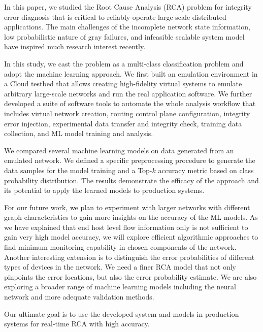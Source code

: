 In this paper, we studied the Root Cause Analysis (RCA) problem for integrity error diagnosis that is critical to reliably operate large-scale distributed applications. The main challenges of the incomplete network state information, low probabilistic nature of gray failures, and infeasible scalable system model have inspired much research interest recently.

In this study, we cast the problem as a multi-class classification problem and adopt the machine learning approach. We first built an emulation environment in a Cloud testbed that allows creating high-fidelity virtual systems to emulate arbitrary large-scale networks and run the real application software. We further developed a suite of software tools to automate the whole analysis workflow that includes virtual network creation, routing control plane configuration, integrity error injection, experimental data transfer and integrity check, training data collection, and ML model training and analysis.

We compared several machine learning models on data generated from an emulated network. We defined a specific preprocessing procedure to generate the data samples for the model training and a Top-$k$ accuracy metric based on class probability distribution. The results demonstrate the efficacy of the approach and its potential to apply the learned models to production systems.  

For our future work, we plan to experiment with larger networks with different graph characteristics to gain more insights on the accuracy of the ML models. As we have explained that end host level flow information only is not sufficient to gain very high model accuracy, we will explore efficient algorithmic approaches to find minimum monitoring capability in chosen components of the network. Another interesting extension is to distinguish the error probabilities of different types of devices in the network. We need a finer RCA model that not only pinpoints the error locations, but also the error probability estimate. We are also exploring a broader range of machine learning models including the neural network and more adequate validation methods. 

Our ultimate goal is to use the developed system and models in production systems for real-time RCA with high accuracy.

